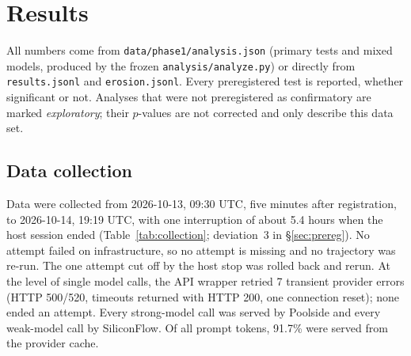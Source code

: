 \documentclass[10pt]{article}
\newcommand{\code}[1]{\texttt{#1}}
\begin{document}
\section{Results}\label{sec:results}

All numbers come from \code{data/phase1/analysis.json} (primary tests and mixed models, produced by
the frozen \code{analysis/analyze.py}) or directly from \code{results.jsonl} and
\code{erosion.jsonl}. Every preregistered test is reported, whether significant or not.
Analyses that were not preregistered as confirmatory are marked \emph{exploratory}; their
$p$-values are not corrected and only describe this data set.

\subsection{Data collection}\label{sec:res-collection}

Data were collected from 2026-10-13, 09:30 UTC, five minutes after registration, to 2026-10-14,
19:19 UTC, with one interruption of about 5.4 hours when the host session ended
(Table~\ref{tab:collection}; deviation~3 in \S\ref{sec:prereg}). No attempt failed on
infrastructure, so no attempt is missing and no trajectory was re-run. The one attempt cut off by
the host stop was rolled back and rerun. At the level of single model calls, the API wrapper
retried 7 transient provider errors (HTTP 500/520, timeouts returned with HTTP 200, one connection
reset); none ended an attempt. Every strong-model call was served by Poolside and every weak-model
call by SiliconFlow. Of all prompt tokens, 91.7\% were served from the provider cache.
\end{document}
